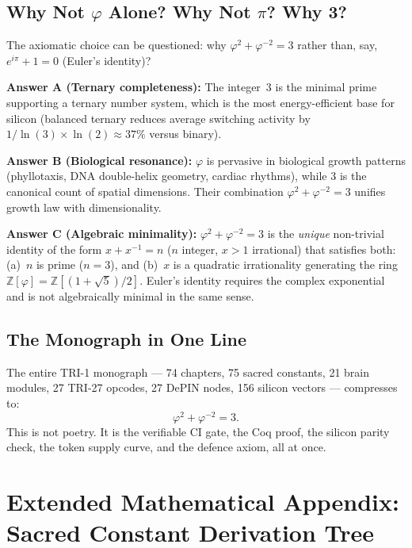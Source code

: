 \subsection{Why Not \(\varphi\) Alone? Why Not \(\pi\)? Why 3?}

The axiomatic choice can be questioned: why \(\varphi^2 + \varphi^{-2} = 3\)
rather than, say, \(e^{i\pi} + 1 = 0\) (Euler's identity)?

\textbf{Answer A (Ternary completeness):} The integer~3 is the minimal prime
supporting a ternary number system, which is the most energy-efficient base for
silicon (balanced ternary reduces average switching activity by
\(1/\ln(3) \times \ln(2) \approx 37\%\) versus binary).

\textbf{Answer B (Biological resonance):} \(\varphi\) is pervasive in
biological growth patterns (phyllotaxis, DNA double-helix geometry, cardiac
rhythms), while 3 is the canonical count of spatial dimensions.
Their combination \(\varphi^2 + \varphi^{-2} = 3\) unifies growth law with
dimensionality.

\textbf{Answer C (Algebraic minimality):}
\(\varphi^2 + \varphi^{-2} = 3\) is the \emph{unique} non-trivial identity of
the form \(x + x^{-1} = n\) (\(n\) integer, \(x > 1\) irrational) that
satisfies both: (a)~\(n\) is prime (\(n = 3\)), and (b)~\(x\) is a quadratic
irrationality generating the ring \(\mathbb{Z}[\varphi] = \mathbb{Z}[(1+\sqrt{5})/2]\).
Euler's identity requires the complex exponential and is not algebraically
minimal in the same sense.

\subsection{The Monograph in One Line}

The entire TRI-1 monograph — 74 chapters, 75 sacred constants, 21 brain
modules, 27 TRI-27 opcodes, 27 DePIN nodes, 156 silicon vectors — compresses
to:
\begin{equation}
  \varphi^2 + \varphi^{-2} = 3. \tag{T}
\end{equation}
This is not poetry.
It is the verifiable CI gate, the Coq proof, the silicon parity check, the
token supply curve, and the defence axiom, all at once.


\section{Extended Mathematical Appendix: Sacred Constant Derivation Tree}
\label{sec:flos74-appendix-a}

